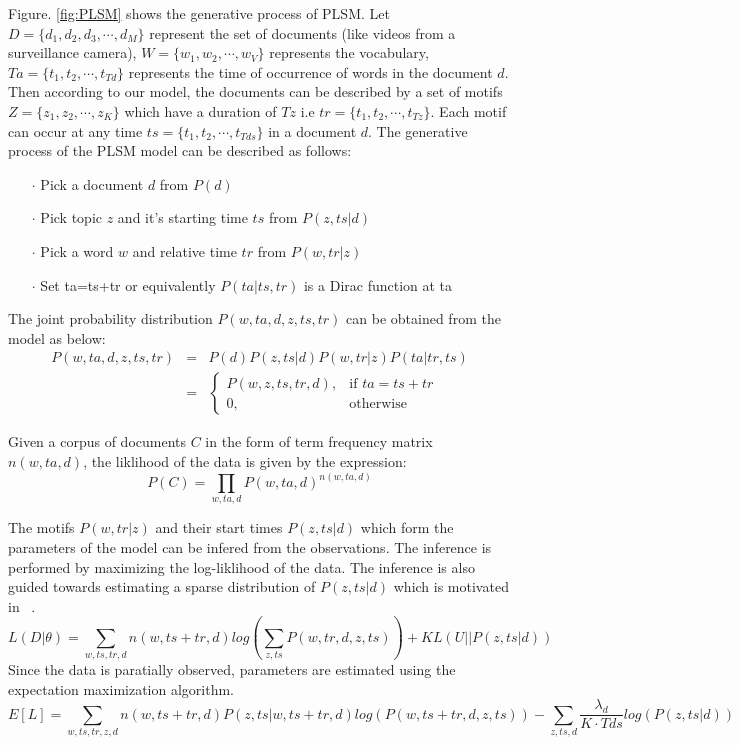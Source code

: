 Figure. \ref{fig:PLSM} shows the generative process of PLSM. Let $D = \{d_{1},d_{2},d_{3}, \cdots, d_{M}\}$ represent the set of documents (like videos from a surveillance camera), $W = \{w_{1},w_{2}, \cdots, w_{V}\}$ represents the vocabulary, $Ta = \{t_{1},t_{2}, \cdots, t_{Td}\}$ represents the time of occurrence of words in the document $d$. Then according to our model, the documents can be described by a set of motifs $Z=\{z_{1}, z_{2}, \cdots, z_{K}\}$ which have a duration of $Tz$ i.e $tr = \{t_{1}, t_{2}, \cdots, t_{Tz}\}$. Each motif can occur at any time $ts = \{t_{1}, t_{2}, \cdots, t_{Tds}\}$ in a document $d$. The generative process of the PLSM model can be described as follows:
\begin{itemize}

\item[$\cdot$] Pick a document $d$ from $P(d)$
\item[$\cdot$] Pick topic $z$ and it's starting time $ts$ from $P(z,ts|d)$
\item[$\cdot$] Pick a word $w$ and relative time $tr$ from $P(w,tr|z)$ 
\item[$\cdot$] Set ta=ts+tr or equivalently $P(ta|ts,tr)$ is a Dirac function at ta

\end{itemize}
The joint probability distribution $P(w,ta,d,z,ts,tr)$ can be obtained from the model as below:
\begin{eqnarray}
P(w,ta,d,z,ts,tr) & = & P(d)P(z,ts|d)P(w,tr|z)P(ta|tr,ts) \\
				 & = &\begin{cases}
    P(w,z,ts,tr,d),& \text{if } ta = ts+tr\\
    0,              & \text{otherwise}
\end{cases}
\end{eqnarray}

Given a corpus of documents $C$ in the form of term frequency matrix $n(w,ta,d)$, the liklihood of the data is given by the expression:
\begin{equation}
P(C) = \prod_{w,ta,d} P(w,ta,d)^{n(w,ta,d)}
\end{equation}

The motifs $P(w,tr|z)$ and their start times $P(z,ts|d)$ which form the parameters of the model can be infered from the observations. The inference is performed by maximizing the log-liklihood of the data. The inference is also guided towards estimating a sparse distribution of $P(z,ts|d)$ which is motivated in ~\cite{Varadarajan_IJCV_2012,varadarajan_probabilistic_2010}.
\begin{equation}
L(D|\theta) = \sum_{w,ts,tr,d} n(w,ts+tr,d)log(\sum_{z,ts} P(w,tr,d,z,ts)) + KL(U||P(z,ts|d))
\end{equation}
 Since the data is paratially observed, parameters are estimated using the expectation maximization algorithm.
 \begin{equation}
 E[L] = \sum_{w,ts,tr,z,d}n(w,ts+tr,d)P(z,ts|w,ts+tr,d)log(P(w,ts+tr,d,z,ts)) - \sum_{z,ts,d}\frac{\lambda_{d}}{K \cdot Tds} log(P(z,ts|d))
 \end{equation}
 
